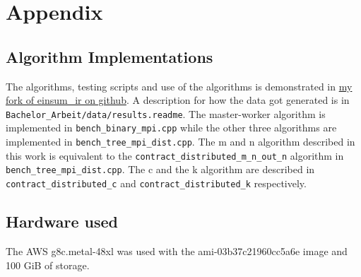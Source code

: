 \newpage

\appendix

\section{Appendix}

\subsection{Algorithm Implementations}

The algorithms, testing scripts and use of the algorithms is demonstrated in 
\href{https://github.com/Minutenreis/einsum_ir}{my fork of einsum\_ir on github}.
A description for how the data got generated is in \\
\texttt{Bachelor\_Arbeit/data/results.readme}.
The master-worker algorithm is implemented in \texttt{bench\_binary\_mpi.cpp} while the other three algorithms are implemented in \texttt{bench\_tree\_mpi\_dist.cpp}.
The m and n algorithm described in this work is equivalent to the \texttt{contract\_distributed\_m\_n\_out\_n} algorithm in \texttt{bench\_tree\_mpi\_dist.cpp}.
The c and the k algorithm are described in\\ \texttt{contract\_distributed\_c} and \texttt{contract\_distributed\_k} respectively.

\subsection{Hardware used}

The AWS g8c.metal-48xl was used with the ami-03b37c21960cc5a6e image and 100 GiB of storage.
